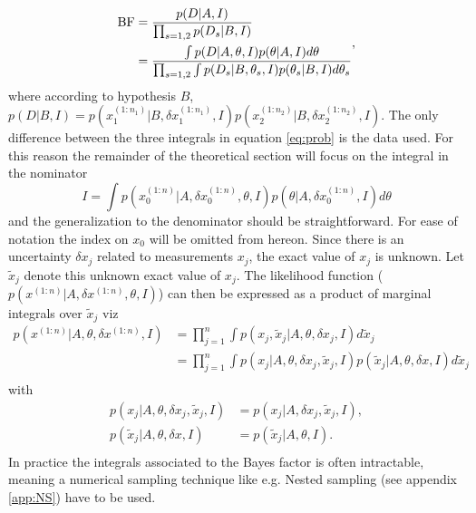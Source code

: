 

\begin{equation}
	\begin{split}
		\rm BF &= \frac{p(D|A,I)}{\prod_{s=1,2}p(D_s|B,I)}\\
		&=\frac{\int p(D|A,\theta,I) p(\theta|A,I) d\theta}{\prod_{s=1,2}\int p(D_s|B,\theta_s,I) p(\theta_s|B,I)d\theta_s}
	\end{split},
	\label{eq:prob}
\end{equation}
where according to hypothesis $B$, $p(D|B,I) =p(x_1^{(1:n_1)}|B,\delta x_1^{(1:n_1)},I)p(x_2^{(1:n_2)}|B,\delta x_2^{(1:n_2)},I)$. The only difference between the three integrals in equation \eqref{eq:prob} is the data used. For this reason the remainder of the theoretical section will focus on the integral in the nominator
\begin{equation}
	I = \int p(x_0^{(1:n)}|A,\delta x_0^{(1:n)},\theta,I) p(\theta|A,\delta x_0^{(1:n)},I) d\theta
\end{equation}
and the generalization to the denominator should be straightforward. For ease of notation the index on $x_0$ will be omitted from hereon. Since there is an uncertainty $\delta x_j$ related to measurements $x_j$, the exact value of $x_j$ is unknown. Let $\tilde{x}_j$ denote this unknown exact value of $x_j$. The likelihood function ($p(x^{(1:n)}|A,\delta x^{(1:n)},\theta,I)$) can then be expressed as a product of marginal integrals over $\tilde{x}_j$ viz
\begin{equation}
	\begin{split}
		p(x^{(1:n)}|A,\theta,\delta x^{(1:n)}, I) &= \prod_{j=1}^{n}\int p(x_j,\tilde{x}_j|A,\theta,\delta x_j, I)d \tilde{x}_j\\
		&= \prod_{j=1}^{n}\int p(x_j|A,\theta,\delta x_j, \tilde{x}_j, I)p(\tilde{x}_j|A,\theta,\delta x, I)d \tilde{x}_j\\
	\end{split}
\end{equation}
with
\begin{equation}
	\begin{split}
		p(x_j|A,\theta,\delta x_j, \tilde{x}_j, I)
		& = p(x_j|A,\delta x_j, \tilde{x}_j, I),\\
		p(\tilde{x}_j|A,\theta,\delta x, I)
		&=p(\tilde{x}_j|A,\theta, I).\\
	\end{split}
\end{equation}
In practice the integrals associated to the Bayes factor is often intractable, meaning a numerical sampling technique like e.g. Nested sampling (see appendix \ref{app:NS}) have to be used.

